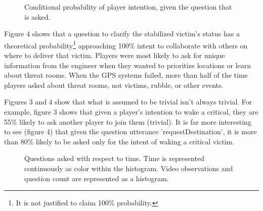 \begin{figure}[h!]
    \centering
    \caption{ Conditional probability of player intention, given the question that is asked.}
\end{figure}

Figure 4 shows that a question to clarify the stabilized victim's status has a theoretical probability\footnote{It is not justified to claim 100\% probability.} approaching 100\% intent to collaborate with others on where to deliver that victim. Players were most likely to ask for unique information from the engineer when they wanted to prioritize locations or learn about threat rooms. When the GPS systems failed, more than half of the time players asked about threat rooms, not victims, rubble, or other events.

Figures 3 and 4 show that what is assumed to be trivial isn't always trivial. For example, figure 3 shows that given a player's intention to wake a critical, they are 55\% likely to ask another player to join them (trivial). It is far more interesting to see (figure 4) that given the question utterance 'requestDestination', it is more than 80\% likely to be asked only for the intent of waking a critical victim.





\begin{figure}[h!]
    \centering
    \caption{Questions asked with respect to time. Time is represented continuously as color within the histogram. Video observations and question count are represented as a histogram. }
    \end{figure}
    
